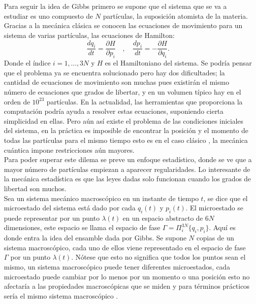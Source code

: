 \\
\\
Para seguir la idea de Gibbs primero se supone que el sistema que se va a estudiar es uno compuesto de $N$ partículas, la suposición atomista de la materia. Gracias a la mecánica clásica se conocen las ecuaciones de movimiento para un sistema de varias partículas, las ecuaciones de Hamilton:
\begin{equation} \label{Hamilton}
\frac{dq_{i}}{dt}= \frac{\partial H}{\partial p_{i}} \quad , \quad \frac{d p_{i}}{dt} =-\frac{\partial H}{\partial q_{i}}.
\end{equation}
Donde el índice $i=1,...,3N$ y $H$ es el Hamiltoniano del sistema. Se podría pensar que el problema ya se encuentra solucionado pero hay dos dificultades; la cantidad de ecuaciones de movimiento son muchas pues existirán el mismo número de ecuaciones que grados de libertar, y en un volumen típico hay en el orden de $10^{23}$ partículas. En la actualidad, las herramientas que proporciona la computación podría ayuda a resolver estas ecuaciones, suponiendo cierta simplicidad en ellas. Pero aún así existe el problema de las condiciones iniciales del sistema, en la práctica es imposible de encontrar la posición y el momento de todas las partículas para el mismo tiempo esto es en el caso clásico \cite{LandauStat}, la mecánica cuántica impone restricciones aún mayores.
\\
Para poder superar este dilema se preve un enfoque estadístico, donde se ve que a mayor número de partículas empiezan a aparecer regularidades. Lo interesante de la mecánica estadística es que las leyes dadas solo funcionan cuando los grados de libertad son muchos.
\\
Sea un sistema mecánico macroscópico en un instante de tiempo $t$,  se dice que el microestado del sistema está dado por cada $q_{i}(t)$ y $p_{i}(t)$. El microestado se puede representar por un punto $\lambda(t)$ en un espacio  abstracto de $6N$ dimensiones, este espacio se llama el espacio de fase $\Gamma = \Pi^{3N}_{i} \{q_{i}, p_{i} \}$.
Aquí es donde entra la idea del ensamble dada por Gibbs. Se supone $N$ copias de un sistema macroscópico, cada uno de ellos viene representado en el espacio de fase $\Gamma$ por un punto $\lambda(t)$. Nótese que esto no significa  que todos los puntos sean el mismo, un sistema macroscópico puede tener diferentes microestados, cada microestado puede cambiar por lo menos por un momento o una posición esto no afectaría a las propiedades macroscópicas que se miden y para términos prácticos sería el mismo sistema macroscópico \cite{KardarStat}.
